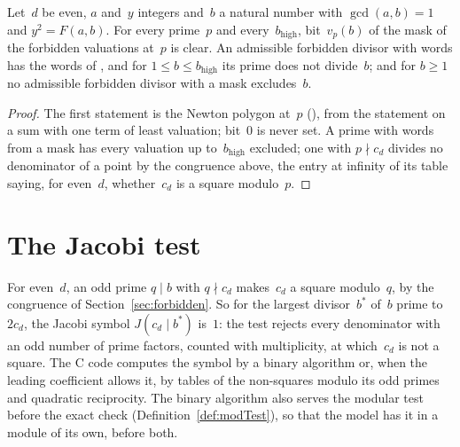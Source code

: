 \begin{lemma}\label{lem:forbidden}
  \leanok
  Let~$d$ be even, $a$ and~$y$ integers and~$b$ a natural number with $\gcd(a, b) = 1$ and
  $y^2 = F(a, b)$. For every prime~$p$ and every~$b_{\mathrm{high}}$, bit~$v_p(b)$ of the mask of
  the forbidden valuations at~$p$ is clear. An admissible forbidden divisor with words has the words
  of , and for $1 \le b \le b_{\mathrm{high}}$ its prime does
  not divide~$b$; and for $b \ge 1$ no admissible forbidden divisor with a mask excludes~$b$.
\end{lemma}

\begin{proof}
  \leanok
  The first statement is the Newton polygon at~$p$
  (), from the statement on
  a sum with one term of least valuation; bit~$0$ is never set. A prime with words from a mask has
  every valuation up to~$b_{\mathrm{high}}$ excluded; one with $p \nmid c_d$ divides no denominator
  of a point by the congruence above, the entry at infinity of its table saying, for even~$d$,
  whether~$c_d$ is a square modulo~$p$.
\end{proof}

\section{The Jacobi test}\label{sec:jacobi}

For even~$d$, an odd prime $q \mid b$ with $q \nmid c_d$ makes~$c_d$ a square modulo~$q$, by the
congruence of Section~\ref{sec:forbidden}. So for the largest divisor~$b^*$ of~$b$ prime to $2 c_d$,
the Jacobi symbol $J(c_d \mid b^*)$ is~$1$: the test rejects every denominator with an odd number of
prime factors, counted with multiplicity, at which~$c_d$ is not a square. The C code computes the
symbol by a binary algorithm or, when the leading coefficient allows it, by tables of the
non-squares modulo its odd primes and quadratic reciprocity. The binary algorithm also serves the
modular test before the exact check (Definition~\ref{def:modTest}), so that the model has it in a
module of its own, before both.

